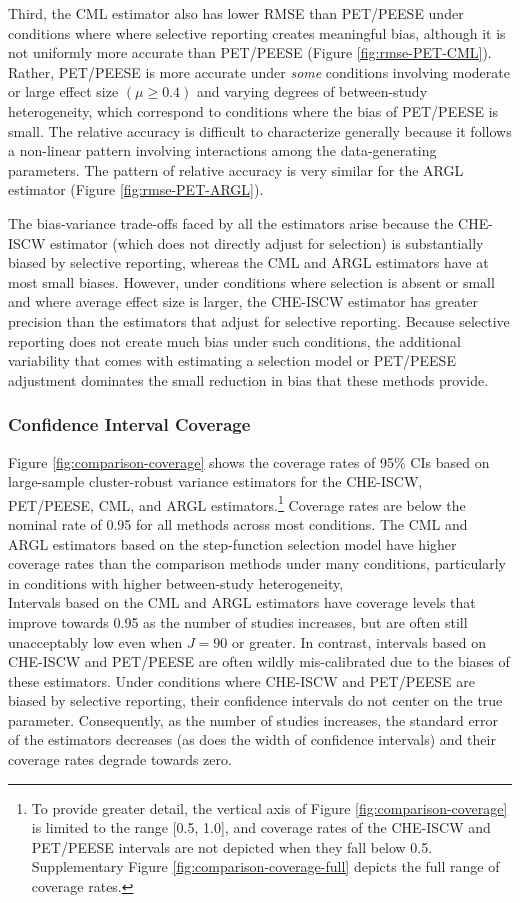 \documentclass[
  man, donotrepeattitle,floatsintext]{apa7}
\begin{document}
Third, the CML estimator also has lower RMSE than PET/PEESE under conditions where where selective reporting creates meaningful bias, although it is not uniformly more accurate than PET/PEESE (Figure \ref{fig:rmse-PET-CML}).
Rather, PET/PEESE is more accurate under \emph{some} conditions involving moderate or large effect size \((\mu \geq 0.4)\) and varying degrees of between-study heterogeneity,
which correspond to conditions where the bias of PET/PEESE is small.
The relative accuracy is difficult to characterize generally because it follows a non-linear pattern involving interactions among the data-generating parameters.
The pattern of relative accuracy is very similar for the ARGL estimator (Figure \ref{fig:rmse-PET-ARGL}).

The bias-variance trade-offs faced by all the estimators arise because the CHE-ISCW estimator (which does not directly adjust for selection) is substantially biased by selective reporting, whereas the CML and ARGL estimators have at most small biases.
However, under conditions where selection is absent or small and where average effect size is larger, the CHE-ISCW estimator has greater precision than the estimators that adjust for selective reporting.
Because selective reporting does not create much bias under such conditions, the additional variability that comes with estimating a selection model or PET/PEESE adjustment dominates the small reduction in bias that these methods provide.

\subsubsection{Confidence Interval Coverage}\label{confidence-interval-coverage}

Figure \ref{fig:comparison-coverage} shows the coverage rates of 95\% CIs based on large-sample cluster-robust variance estimators for the CHE-ISCW, PET/PEESE, CML, and ARGL estimators.\footnote{To provide greater detail, the vertical axis of Figure \ref{fig:comparison-coverage} is limited to the range {[}0.5, 1.0{]}, and coverage rates of the CHE-ISCW and PET/PEESE intervals are not depicted when they fall below 0.5. Supplementary Figure \ref{fig:comparison-coverage-full} depicts the full range of coverage rates.}
Coverage rates are below the nominal rate of 0.95 for all methods across most conditions.
The CML and ARGL estimators based on the step-function selection model have higher coverage rates than the comparison methods under many conditions, particularly in conditions with higher between-study heterogeneity,\\
Intervals based on the CML and ARGL estimators have coverage levels that improve towards 0.95 as the number of studies increases, but are often still unacceptably low even when \(J = 90\) or greater.
In contrast, intervals based on CHE-ISCW and PET/PEESE are often wildly mis-calibrated due to the biases of these estimators.
Under conditions where CHE-ISCW and PET/PEESE are biased by selective reporting, their confidence intervals do not center on the true parameter. Consequently, as the number of studies increases, the standard error of the estimators decreases (as does the width of confidence intervals) and their coverage rates degrade towards zero.
\end{document}
